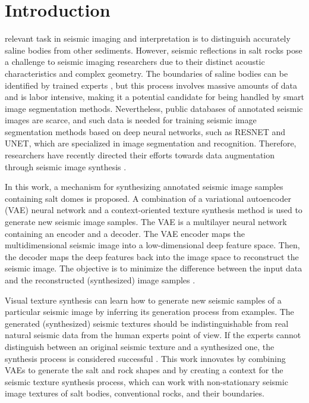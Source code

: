 \documentclass{ieeeaccess}
\begin{document}
\section{Introduction}
\label{sec:introduction}
 relevant task in seismic imaging and interpretation is to distinguish accurately saline bodies from other sediments. However, seismic reflections in salt rocks pose a challenge to seismic imaging researchers due to their distinct acoustic characteristics and complex geometry. The boundaries of saline bodies can be identified by trained experts \cite{ref5}, but this process involves massive amounts of data and is labor intensive, making it a potential candidate for being handled by smart image segmentation methods. Nevertheless, public databases of annotated seismic images are scarce, and such data is needed for training seismic image segmentation methods based on deep neural networks, such as RESNET and UNET, which are specialized in image segmentation and recognition. Therefore, researchers have recently directed their efforts towards data augmentation through seismic image synthesis \cite{ref1}.

In this work, a mechanism for synthesizing annotated seismic image samples containing salt domes is proposed. A combination of a variational autoencoder (VAE) neural network and a context-oriented texture synthesis method is used to generate new seismic image samples. The VAE is a multilayer neural network containing an encoder and a decoder. The VAE encoder maps the multidimensional seismic image into a low-dimensional deep feature space. Then, the decoder maps the deep features back into the image space to reconstruct the seismic image. The objective is to minimize the difference between the input data and the reconstructed (synthesized) image samples \cite{ref3}.

Visual texture synthesis can learn how to generate new seismic samples of a particular seismic image by inferring its generation process from examples. The generated (synthesized) seismic textures should be indistinguishable from real natural seismic data from the human experts point of view. If the experts cannot distinguish between an original seismic texture and a synthesized one, the synthesis process is considered successful \cite{ref4}. This work innovates by combining VAEs to generate the salt and rock shapes and by creating a context for the seismic texture synthesis process, which can work with non-stationary seismic image textures of salt bodies, conventional rocks, and their boundaries. 
\end{document}
